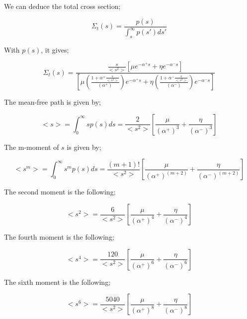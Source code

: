 \documentclass[preprint,12pt]{elsarticle}
\newcommand{\bl}{\big<}
\newcommand{\bg}{\big>}
\begin{document}
We can deduce the total cross section;

\begin{equation}
\Sigma_t(s) = \frac{p(s)}{\int_s^\infty p(s')ds'}
\end{equation}

With $p(s)$, it gives;

\begin{equation}
\Sigma_t(s) = \frac{\frac{s}{{{\bl s^2 \bg}}} \left[\mu e^{-\alpha^+ s} + \eta e^{-\alpha^- s}\right]}{\left[\mu \left( \frac{1+ \alpha^+\frac{s}{{{\bl s^2 \bg}}}}{\left(\alpha^+\right)}\right)e^{-\alpha^+ s} + \eta \left( \frac{1+ \alpha^-\frac{s}{{{\bl s^2 \bg}}}}{\left(\alpha^-\right)}\right)e^{-\alpha^- s}\right]}
\end{equation}

The mean-free path is given by;

\begin{equation}
{\bl s\bg} = \int_0^\infty sp(s) ds = \frac{2}{{\bl s^2 \bg}}\left[\frac{\mu}{\left(\alpha^+\right)^3} + \frac{\eta}{\left(\alpha^-\right)^3}\right]
\end{equation}

The m-moment of $s$ is given by;

\begin{equation}
{\bl s^m \bg} = \int_0^\infty s^m p(s) ds = \frac{(m+1)!}{{\bl s^2 \bg}}\left[\frac{\mu}{\left(\alpha^+\right)^{(m+2)}} + \frac{\eta}{\left(\alpha^-\right)^{(m+2)}}\right]
\end{equation}

The second moment is the following;

\begin{equation}
{\bl s^2 \bg} = \frac{6}{{\bl s^2 \bg}}\left[\frac{\mu}{\left(\alpha^+\right)^{4}} + \frac{\eta}{\left(\alpha^-\right)^{4}}\right]
\end{equation}

The fourth moment is the following;

\begin{equation}
{\bl s^4 \bg} = \frac{120}{{\bl s^2 \bg}}\left[\frac{\mu}{\left(\alpha^+\right)^{6}} + \frac{\eta}{\left(\alpha^-\right)^{6}}\right]
\end{equation}

The sixth moment is the following;

\begin{equation}
{\bl s^6 \bg} = \frac{5040}{{\bl s^2 \bg}}\left[\frac{\mu}{\left(\alpha^+\right)^{8}} + \frac{\eta}{\left(\alpha^-\right)^{8}}\right]
\end{equation}
\end{document}
